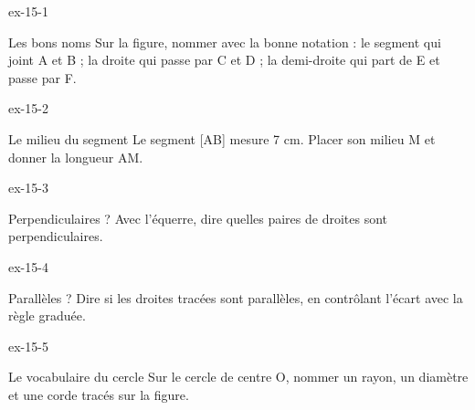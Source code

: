 \clearpage{}
\begin{blocLivre}{ex-15-1}\begin{exercice}[1]{Les bons noms}
Sur la figure, nommer avec la bonne notation : le segment qui joint A et B ; la droite qui passe par C et D ; la demi-droite qui part de E et passe par F.
\label{fig-ex-15-1}
\end{exercice}\end{blocLivre}
\begin{blocLivre}{ex-15-2}\begin{exercice}[1]{Le milieu du segment}
Le segment [AB] mesure 7 cm. Placer son milieu M et donner la longueur AM.
\label{fig-ex-15-2}
\end{exercice}\end{blocLivre}
\begin{blocLivre}{ex-15-3}\begin{exercice}[1]{Perpendiculaires ?}
Avec l’équerre, dire quelles paires de droites sont perpendiculaires.
\label{fig-ex-15-3}
\end{exercice}\end{blocLivre}
\begin{blocLivre}{ex-15-4}\begin{exercice}[1]{Parallèles ?}
Dire si les droites tracées sont parallèles, en contrôlant l’écart avec la règle graduée.
\label{fig-ex-15-4}
\end{exercice}\end{blocLivre}
\begin{blocLivre}{ex-15-5}\begin{exercice}[1]{Le vocabulaire du cercle}
Sur le cercle de centre O, nommer un rayon, un diamètre et une corde tracés sur la figure.
\label{fig-ex-15-5}
\end{exercice}\end{blocLivre}

